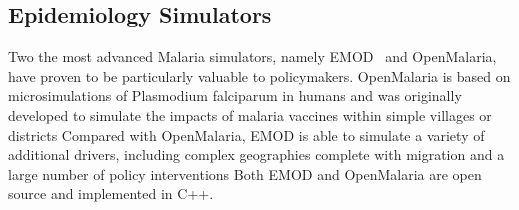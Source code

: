 \documentclass{article}
\begin{document}
\subsection{Epidemiology Simulators}

Two the most advanced Malaria simulators, namely EMOD~\cite{bershteyn2018implementation} and OpenMalaria\cite{smith2008towards}, have proven to be particularly valuable to policymakers.
OpenMalaria is based on microsimulations of Plasmodium falciparum in humans and was originally developed to simulate the impacts of malaria vaccines within simple villages or districts
Compared with OpenMalaria, EMOD is able to simulate a variety of additional drivers, including complex geographies complete with migration and a large number of policy interventions
Both EMOD and OpenMalaria are open source and implemented in C++.







%


\end{document}
